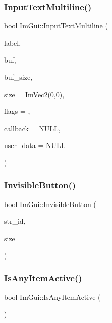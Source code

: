 \subsubsection{\texorpdfstring{Input\+Text\+Multiline()}{InputTextMultiline()}}
{\footnotesize\ttfamily bool Im\+Gui\+::\+Input\+Text\+Multiline (\begin{DoxyParamCaption}\item[{const char $\ast$}]{label,  }\item[{char $\ast$}]{buf,  }\item[{size\+\_\+t}]{buf\+\_\+size,  }\item[{const \hyperlink{struct_im_vec2}{Im\+Vec2} \&}]{size = {\ttfamily \hyperlink{struct_im_vec2}{Im\+Vec2}(0,0)},  }\item[{Im\+Gui\+Input\+Text\+Flags}]{flags = {},  }\item[{Im\+Gui\+Text\+Edit\+Callback}]{callback = {\ttfamily NULL},  }\item[{void $\ast$}]{user\+\_\+data = {\ttfamily NULL} }\end{DoxyParamCaption})}

\hypertarget{namespace_im_gui_a22668d440cbbb1f8be07241d9c6d9096}{}\label{namespace_im_gui_a22668d440cbbb1f8be07241d9c6d9096} 
\subsubsection{\texorpdfstring{Invisible\+Button()}{InvisibleButton()}}
{\footnotesize\ttfamily bool Im\+Gui\+::\+Invisible\+Button (\begin{DoxyParamCaption}\item[{const char $\ast$}]{str\+\_\+id,  }\item[{const \hyperlink{struct_im_vec2}{Im\+Vec2} \&}]{size }\end{DoxyParamCaption})}

\hypertarget{namespace_im_gui_acdc18199d50d26919312db5f9707b8dc}{}\label{namespace_im_gui_acdc18199d50d26919312db5f9707b8dc} 
\subsubsection{\texorpdfstring{Is\+Any\+Item\+Active()}{IsAnyItemActive()}}
{\footnotesize\ttfamily bool Im\+Gui\+::\+Is\+Any\+Item\+Active (\begin{DoxyParamCaption}{ }\end{DoxyParamCaption})}

